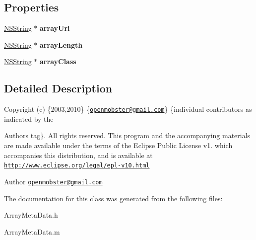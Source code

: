 \subsection*{\-Properties}
\begin{DoxyCompactItemize}
\item 
\hypertarget{interface_array_meta_data_a860a557b87e0c559db7fd7c840409cee}{
\hyperlink{class_n_s_string}{\-N\-S\-String} $\ast$ {\bfseries array\-Uri}}
\label{interface_array_meta_data_a860a557b87e0c559db7fd7c840409cee}

\item 
\hypertarget{interface_array_meta_data_a450df0dafccdb9905bc4164e91129026}{
\hyperlink{class_n_s_string}{\-N\-S\-String} $\ast$ {\bfseries array\-Length}}
\label{interface_array_meta_data_a450df0dafccdb9905bc4164e91129026}

\item 
\hypertarget{interface_array_meta_data_adc0bd99d0f5b34b67b312779a298f294}{
\hyperlink{class_n_s_string}{\-N\-S\-String} $\ast$ {\bfseries array\-Class}}
\label{interface_array_meta_data_adc0bd99d0f5b34b67b312779a298f294}

\end{DoxyCompactItemize}


\subsection{\-Detailed \-Description}
\-Copyright (c) \{2003,2010\} \{\href{mailto:openmobster@gmail.com}{\tt openmobster@gmail.\-com}\} \{individual contributors as indicated by the \begin{DoxyAuthor}{\-Authors}
tag\}. \-All rights reserved. \-This program and the accompanying materials are made available under the terms of the \-Eclipse \-Public \-License v1. which accompanies this distribution, and is available at \href{http://www.eclipse.org/legal/epl-v10.html}{\tt http\-://www.\-eclipse.\-org/legal/epl-\/v10.\-html}
\end{DoxyAuthor}
\begin{DoxyAuthor}{\-Author}
\href{mailto:openmobster@gmail.com}{\tt openmobster@gmail.\-com} 
\end{DoxyAuthor}


\-The documentation for this class was generated from the following files\-:\begin{DoxyCompactItemize}
\item 
\-Array\-Meta\-Data.\-h\item 
\-Array\-Meta\-Data.\-m\end{DoxyCompactItemize}
